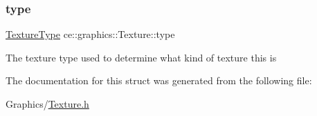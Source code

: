 \subsubsection{\texorpdfstring{type}{type}}
{\footnotesize\ttfamily \hyperlink{_texture_8h_aefaa1df613346ad1fea779bc9a04fdd7}{Texture\+Type} ce\+::graphics\+::\+Texture\+::type}

The texture type used to determine what kind of texture this is 

The documentation for this struct was generated from the following file\+:\begin{DoxyCompactItemize}
\item 
Graphics/\hyperlink{_texture_8h}{Texture.\+h}\end{DoxyCompactItemize}

